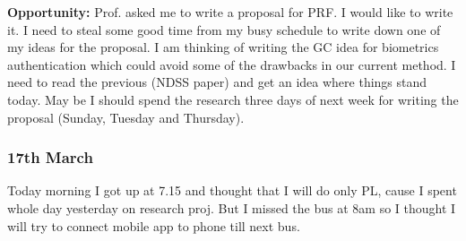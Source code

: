 \documentclass[11pt]{article}
\begin{document}
\textbf{Opportunity:} Prof. asked me to write a proposal for PRF. I would like to write it. I need to steal some good time from my busy schedule to 
write down one of my ideas for the proposal. I am thinking of writing the GC idea for biometrics authentication which could avoid some of the 
drawbacks in our current method. I need to read the previous (NDSS paper) and get an idea where things stand today. May be I should spend the 
research three days of next week for writing the proposal (Sunday, Tuesday and Thursday).

\subsubsection*{17th March}
Today morning I got up at 7.15 and thought that I will do only PL, cause I spent whole day yesterday on research proj. But I missed the bus at 8am so 
I thought I will try to connect mobile app to phone till next bus. \\
\end{document}

